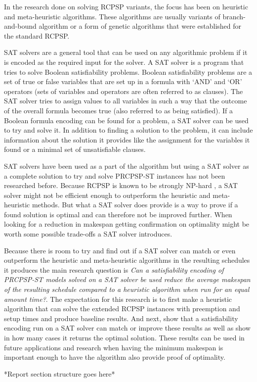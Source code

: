In the research done on solving RCPSP variants, the focus has been on heuristic and meta-heuristic algorithms. These algorithms are usually variants of branch-and-bound algorithm \cite{RN21} or a form of genetic algorithms \cite{RN28} that were established for the standard RCPSP.

SAT solvers are a general tool that can be used on any algorithmic problem if it is encoded as the required input for the solver. A SAT solver is a program that tries to solve Boolean satisfiability problems. Boolean satisfiability problems are a set of true or false variables that are set up in a formula with ‘AND’ and ‘OR’ operators (sets of variables and operators are often referred to as clauses). The SAT solver tries to assign values to all variables in such a way that the outcome of the overall formula becomes true (also referred to as being satisfied). If a Boolean formula encoding can be found for a problem, a SAT solver can be used to try and solve it. In addition to finding a solution to the problem, it can include information about the solution it provides like the assignment for the variables it found or a minimal set of unsatisfiable clauses.

SAT solvers have been used as a part of the algorithm but using a SAT solver as a complete solution to try and solve PRCPSP-ST instances has not been researched before. Because RCPSP is known to be strongly NP-hard \cite{RN20}, a SAT solver might not be efficient enough to outperform the heuristic and meta-heuristic methods. But what a SAT solver does provide is a way to prove if a found solution is optimal and can therefore not be improved further. When looking for a reduction in makespan getting confirmation on optimality might be worth some possible trade-offs a SAT solver introduces.

Because there is room to try and find out if a SAT solver can match or even outperform the heuristic and meta-heuristic algorithms in the resulting schedules it produces the main research question is \textit{Can a satisfiability encoding of PRCPSP-ST models solved on a SAT solver be used reduce the average makespan of the resulting schedule compared to a heuristic algorithm when run for an equal amount time?}. The expectation for this research is to first make a heuristic algorithm that can solve the extended RCPSP instances with preemption and setup times and produce baseline results. And next, show that a satisfiability encoding run on a SAT solver can match or improve these results as well as show in how many cases it returns the optimal solution. These results can be used in future applications and research when having the minimum makespan is important enough to have the algorithm also provide proof of optimality.


*Report section structure goes here*